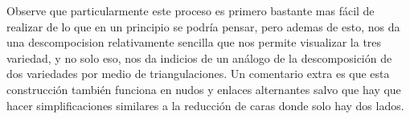 Observe que particularmente este proceso es primero bastante mas fácil de realizar de lo que en un principio se podría pensar, pero ademas de esto, nos da una descompocision relativamente sencilla que nos permite visualizar la tres variedad, y no solo eso, nos da indicios de un análogo de la descomposición de dos variedades por medio de triangulaciones. Un comentario extra es que esta construcción también funciona en nudos y enlaces alternantes salvo que hay que hacer simplificaciones similares a la reducción de caras donde solo hay dos lados.